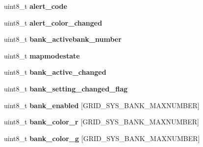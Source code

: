 \begin{DoxyCompactItemize}
\item 
\hypertarget{structgrid__sys__model_acbcdbca8df5dd42ae3176324a559b19f}{uint8\-\_\-t {\bfseries alert\-\_\-code}}\label{structgrid__sys__model_acbcdbca8df5dd42ae3176324a559b19f}

\item 
\hypertarget{structgrid__sys__model_a22f7b5ee382b7b0ea16e6cb5a4c82c23}{uint8\-\_\-t {\bfseries alert\-\_\-color\-\_\-changed}}\label{structgrid__sys__model_a22f7b5ee382b7b0ea16e6cb5a4c82c23}

\item 
\hypertarget{structgrid__sys__model_a0c9eedf880416dc9cb6cf2332ae3e72a}{uint8\-\_\-t {\bfseries bank\-\_\-activebank\-\_\-number}}\label{structgrid__sys__model_a0c9eedf880416dc9cb6cf2332ae3e72a}

\item 
\hypertarget{structgrid__sys__model_acc6dc2c3a9ea85209e5431d9899f4e48}{uint8\-\_\-t {\bfseries mapmodestate}}\label{structgrid__sys__model_acc6dc2c3a9ea85209e5431d9899f4e48}

\item 
\hypertarget{structgrid__sys__model_aae1d3710f0408da691e8451f89910474}{uint8\-\_\-t {\bfseries bank\-\_\-active\-\_\-changed}}\label{structgrid__sys__model_aae1d3710f0408da691e8451f89910474}

\item 
\hypertarget{structgrid__sys__model_ab99a8a7b6e9f522e3566292ad666ab0b}{uint8\-\_\-t {\bfseries bank\-\_\-setting\-\_\-changed\-\_\-flag}}\label{structgrid__sys__model_ab99a8a7b6e9f522e3566292ad666ab0b}

\item 
\hypertarget{structgrid__sys__model_aac55b2f21dd8585acfb9c58e2aaa65fc}{uint8\-\_\-t {\bfseries bank\-\_\-enabled} \mbox{[}G\-R\-I\-D\-\_\-\-S\-Y\-S\-\_\-\-B\-A\-N\-K\-\_\-\-M\-A\-X\-N\-U\-M\-B\-E\-R\mbox{]}}\label{structgrid__sys__model_aac55b2f21dd8585acfb9c58e2aaa65fc}

\item 
\hypertarget{structgrid__sys__model_a2e11f0235b92aa4a4335041ac4d88fa1}{uint8\-\_\-t {\bfseries bank\-\_\-color\-\_\-r} \mbox{[}G\-R\-I\-D\-\_\-\-S\-Y\-S\-\_\-\-B\-A\-N\-K\-\_\-\-M\-A\-X\-N\-U\-M\-B\-E\-R\mbox{]}}\label{structgrid__sys__model_a2e11f0235b92aa4a4335041ac4d88fa1}

\item 
\hypertarget{structgrid__sys__model_a3b9a24fe72c65367bf64f3446ef0ab8f}{uint8\-\_\-t {\bfseries bank\-\_\-color\-\_\-g} \mbox{[}G\-R\-I\-D\-\_\-\-S\-Y\-S\-\_\-\-B\-A\-N\-K\-\_\-\-M\-A\-X\-N\-U\-M\-B\-E\-R\mbox{]}}\label{structgrid__sys__model_a3b9a24fe72c65367bf64f3446ef0ab8f}


\end{DoxyCompactItemize}

